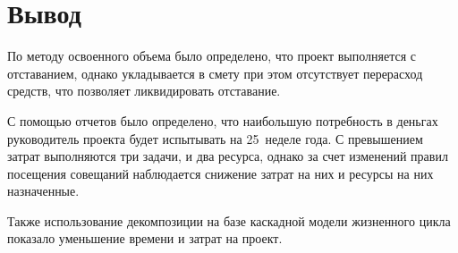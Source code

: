 \section{Вывод}

По методу освоенного объема было определено, что проект выполняется с отставанием, однако укладывается в смету при этом отсутствует перерасход средств, что позволяет ликвидировать отставание.

С помощью отчетов было определено, что наибольшую потребность в деньгах руководитель проекта будет испытывать на 25~неделе года. С превышением затрат выполняются три задачи, и два ресурса, однако за счет изменений правил посещения совещаний наблюдается снижение затрат на них и ресурсы на них назначенные.

Также использование декомпозиции на базе каскадной модели жизненного цикла показало уменьшение времени и затрат на проект.